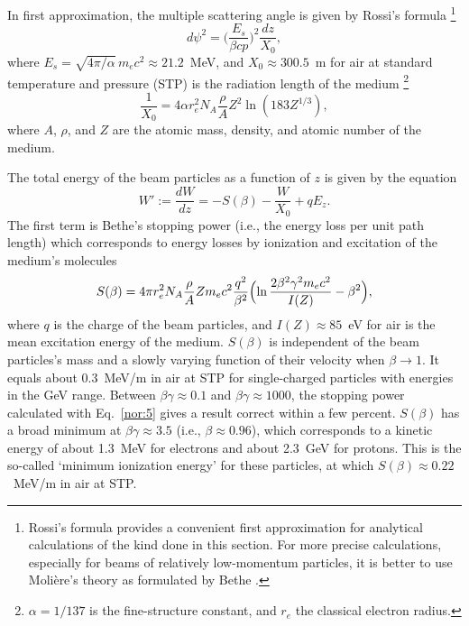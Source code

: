\documentclass [12pt,a4paper,     ]{report} %
\newcommand{\DEF}{:=}                 %
\begin{document}
  In first approximation, the multiple scattering angle is given by Rossi's formula \cite[p.67]{ROSSI1952-}\footnote{Rossi's formula provides a convenient first approximation for analytical calculations of the kind done in this section.  For more precise calculations, especially for beams of relatively low-momentum particles, it is better to use Moli\`ere's theory as formulated by Bethe \cite{BETHE1953-}.}
%
\begin{equation}\label{nor:2} %
       d\psi^2 = \bigl( \frac{E_s}{\beta c p}  \bigr)^2 \frac{dz}{X_0},
\end{equation}
%
where $E_s = \sqrt{4\pi/\alpha}\, m_ec^2 \approx 21.2$~MeV, and  $X_0 \approx 300.5$~m for air at standard temperature and pressure (STP) is the radiation length of the medium \cite[p.50]{BETHE1953-}\footnote{$\alpha=1/137$ is the fine-structure constant, and $r_e$ the classical electron radius.}
%
\begin{equation}\label{nor:3} %
       \frac{1}{X_0} = 4 \alpha r_e^2 N_A \frac{\rho}{A} Z^2 \ln(183 Z^{1/3}),
\end{equation}
%
where $A$, $\rho$, and $Z$ are the atomic mass, density, and atomic number of the medium.
	
The total energy of the beam particles as a function of $z$ is given by the equation
%
\begin{equation}\label{nor:4} %
          W' \DEF  \frac{dW}{dz}  =  -S(\beta) - \frac{W}{X_0}  + qE_z.
\end{equation}
%
The first term is Bethe's stopping power (i.e., the energy loss per unit path length) which corresponds to energy losses by ionization and excitation of the medium's molecules \cite[p.24]{ROSSI1952-}
%
\begin{equation}\label{nor:5} %
    S(\beta) = 4 \pi r_e^2 N_A \frac{\rho}{A} Z m_e c^2
               \frac{q^2}{\beta^2}
               \Bigl( \ln \frac{2\beta^2\gamma^2m_e c^2}{I(Z)} - \beta^2 \Bigr),
\end{equation}
%
where $q$ is the charge of the beam particles, and $I(Z) \approx 85$~eV for air is the mean excitation energy of the medium.  $S(\beta)$ is independent of the beam particles's mass and a slowly varying function of  their velocity when $\beta \rightarrow 1$.  It equals about 0.3~MeV/m in air at STP for single-charged particles with energies in the GeV range.  Between $\beta\gamma \approx 0.1$ and $\beta\gamma \approx 1000$, the stopping power calculated with Eq.~\eqref{nor:5} gives a result correct within a few percent.  $S(\beta)$ has a broad minimum at $\beta\gamma \approx 3.5$ (i.e., $\beta \approx 0.96$), which corresponds to a kinetic energy of about 1.3~MeV for electrons and about 2.3~GeV for protons. This is the so-called `minimum ionization energy' for these particles, at which $S(\beta) \approx 0.22$~MeV/m in air at STP. 
\end{document}
